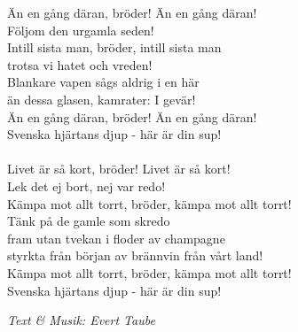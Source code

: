 \vspace{10pt}
Än en gång däran, bröder! Än en gång däran!\\
Följom den urgamla seden!\\
Intill sista man, bröder, intill sista man\\
trotsa vi hatet och vreden!\\
Blankare vapen sågs aldrig i en här\\
än dessa glasen, kamrater: I gevär!\\
Än en gång däran, bröder! Än en gång däran!\\
Svenska hjärtans djup - här är din sup!\\
\\
Livet är så kort, bröder! Livet är så kort!\\
Lek det ej bort, nej var redo!\\
Kämpa mot allt torrt, bröder, kämpa mot allt torrt!\\
Tänk på de gamle som skredo\\
fram utan tvekan i floder av champagne\\
styrkta från början av brännvin från vårt land!\\
Kämpa mot allt torrt, bröder, kämpa mot allt torrt!\\
Svenska hjärtans djup - här är din sup!\par
\vspace{10pt}
{\footnotesize\textit{Text \& Musik: Evert Taube}}
